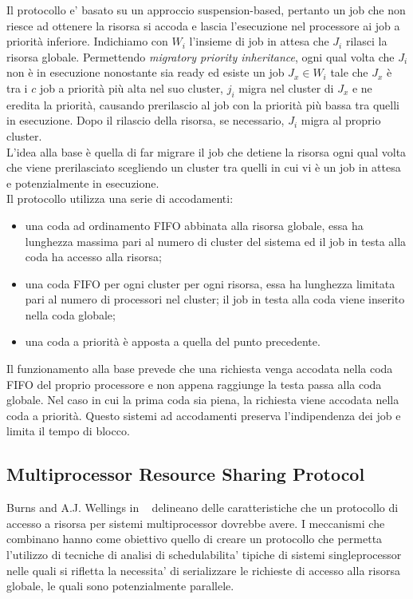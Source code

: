 Il protocollo e' basato su un approccio suspension-based, pertanto un job che non riesce ad ottenere la risorsa si accoda e lascia l’esecuzione nel processore ai job a priorità inferiore. Indichiamo con $W_i$ l'insieme di job in attesa che $J_i$ rilasci la risorsa globale. Permettendo \textit{migratory priority inheritance}, ogni qual volta che $J_i$ non è in esecuzione nonostante sia ready ed esiste un job $J_x \in W_i$ tale che $J_x$ è tra i $c$ job a priorità più alta nel suo cluster, $j_i$ migra nel cluster di $J_x$ e ne eredita la priorità, causando prerilascio al job con la priorità più bassa tra quelli in esecuzione. Dopo il rilascio della risorsa, se necessario, $J_i$ migra al proprio cluster.\\
L'idea alla base è quella di far migrare il job che detiene la risorsa ogni qual volta che viene prerilasciato scegliendo un cluster tra quelli in cui vi è un job in attesa e potenzialmente in esecuzione.\\

Il protocollo utilizza una serie di accodamenti:

\begin{itemize}
\item una coda ad ordinamento FIFO abbinata alla risorsa globale, essa ha lunghezza massima pari al numero di cluster del sistema ed il job in testa alla coda ha accesso alla risorsa;
\item una coda FIFO per ogni cluster per ogni risorsa, essa ha lunghezza limitata pari al numero di processori nel cluster; il job in testa alla coda viene inserito nella coda globale;
\item una coda a priorità è apposta a quella del punto precedente.
\end{itemize}

Il funzionamento alla base prevede che una richiesta venga accodata nella coda FIFO del proprio processore e non appena raggiunge la testa passa alla coda globale. Nel caso in cui la prima coda sia piena, la richiesta viene accodata nella coda a priorità. Questo sistemi ad accodamenti preserva l'indipendenza dei job e limita il tempo di blocco.

\subsection{Multiprocessor Resource Sharing Protocol}
\label{sec:lockProtocols.mrsp}

Burns and A.J. Wellings in ~\cite{Burns:2013:SCM:2547348.2547350} delineano delle caratteristiche che un protocollo di accesso a risorsa per sistemi multiprocessor dovrebbe avere. I meccanismi che combinano hanno come obiettivo quello di creare un protocollo che permetta l’utilizzo di tecniche di analisi di schedulabilita’ tipiche di sistemi singleprocessor nelle quali si rifletta la necessita’ di serializzare le richieste di accesso alla risorsa globale, le quali sono potenzialmente parallele.\\

